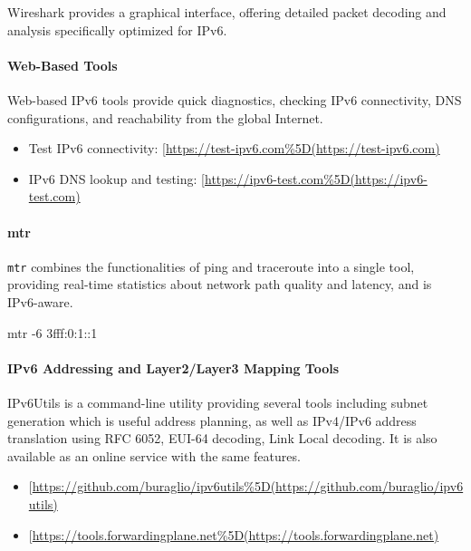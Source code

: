 \documentclass[
]{article}
\newenvironment{Shaded}{}{}
\newcommand{\AttributeTok}[1]{\textcolor[rgb]{0.49,0.56,0.16}{#1}}
\newcommand{\ExtensionTok}[1]{#1}
\newcommand{\NormalTok}[1]{#1}
\providecommand{\tightlist}{%
  \setlength{\itemsep}{0pt}\setlength{\parskip}{0pt}}
\begin{document}
Wireshark provides a graphical interface, offering detailed packet
decoding and analysis specifically optimized for IPv6.

\paragraph{Web-Based Tools}\label{web-based-tools}

Web-based IPv6 tools provide quick diagnostics, checking IPv6
connectivity, DNS configurations, and reachability from the global
Internet.

\begin{itemize}
\tightlist
\item
  Test IPv6 connectivity:
  {[}\url{https://test-ipv6.com\%5D(https://test-ipv6.com)}
\item
  IPv6 DNS lookup and testing:
  {[}\url{https://ipv6-test.com\%5D(https://ipv6-test.com)}
\end{itemize}

\paragraph{mtr}\label{mtr}

\texttt{mtr} combines the functionalities of ping and traceroute into a
single tool, providing real-time statistics about network path quality
and latency, and is IPv6-aware.

\begin{Shaded}
\begin{Highlighting}[]
\ExtensionTok{mtr} \AttributeTok{{-}6}\NormalTok{ 3fff:0:1::1}
\end{Highlighting}
\end{Shaded}

\paragraph{IPv6 Addressing and Layer2/Layer3 Mapping
Tools}\label{ipv6-addressing-and-layer2layer3-mapping-tools}

IPv6Utils is a command-line utility providing several tools including
subnet generation which is useful address planning, as well as IPv4/IPv6
address translation using RFC 6052, EUI-64 decoding, Link Local
decoding. It is also available as an online service with the same
features.

\begin{itemize}
\item
  {[}\url{https://github.com/buraglio/ipv6utils\%5D(https://github.com/buraglio/ipv6utils)}
\item
  {[}\url{https://tools.forwardingplane.net\%5D(https://tools.forwardingplane.net)}
\end{itemize}
\end{document}

